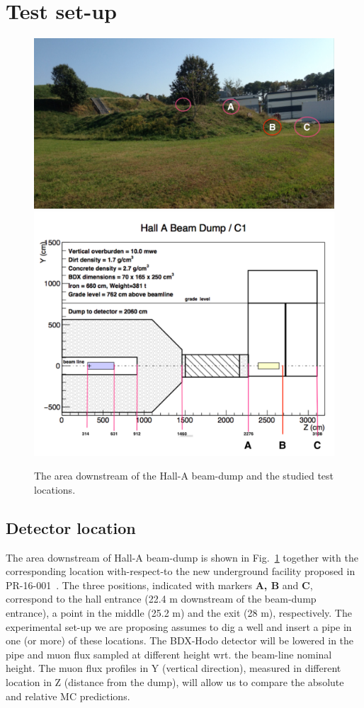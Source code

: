 \section{Test set-up}
\label{sec:setup}
\begin{figure}[h!] 
\center  
\includegraphics[width=11.5cm]{figs/ds-area.pdf}   
\includegraphics[width=11.5cm]{figs/test-plan.pdf}  
\caption{The area downstream of the Hall-A beam-dump and the studied test locations.}
\label{fig:ds-area}
\end{figure}

\subsection{Detector location}
The area downstream of Hall-A beam-dump is shown in Fig.~\ref{fig:ds-area}  together with the corresponding location with-respect-to  
the new  underground facility proposed in PR-16-001~\cite{bdx-proposal}. The three positions, indicated with markers {\bf A, B}  and {\bf C},  correspond to the hall entrance (22.4 m downstream of the beam-dump entrance), a point in the middle  (25.2 m) and the exit (28 m), respectively. The experimental set-up we are proposing  assumes to dig a well and insert a pipe in one (or more) of these locations. The BDX-Hodo detector will be lowered in the pipe and muon flux sampled at different height wrt. the beam-line nominal height. The muon flux profiles in Y (vertical direction), measured in  different location in Z (distance from the dump), will allow us to compare the absolute and relative MC predictions. 

